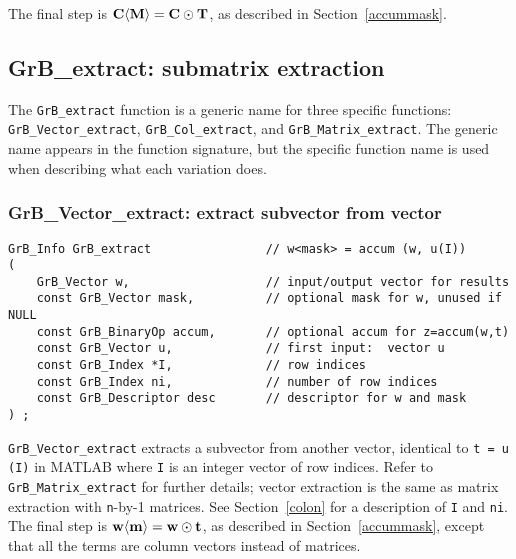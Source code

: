 \documentclass[12pt]{article}
\begin{document}
The final step is ${\bf C \langle M \rangle  = C \odot T}$, as described in
Section~\ref{accummask}.

\newpage
\subsection{{\sf GrB\_extract:} submatrix extraction } %
\label{extract}

The \verb'GrB_extract' function is a generic name for three specific functions:
\verb'GrB_Vector_extract', \verb'GrB_Col_extract', and
\verb'GrB_Matrix_extract'.  The generic name appears in the function signature,
but the specific function name is used when describing what each variation
does.

\subsubsection{{\sf GrB\_Vector\_extract:} extract subvector from vector}
\label{extract_vector}

\begin{mdframed}[userdefinedwidth=6in]
{\footnotesize
\begin{verbatim}
GrB_Info GrB_extract                // w<mask> = accum (w, u(I))
(
    GrB_Vector w,                   // input/output vector for results
    const GrB_Vector mask,          // optional mask for w, unused if NULL
    const GrB_BinaryOp accum,       // optional accum for z=accum(w,t)
    const GrB_Vector u,             // first input:  vector u
    const GrB_Index *I,             // row indices
    const GrB_Index ni,             // number of row indices
    const GrB_Descriptor desc       // descriptor for w and mask
) ;
\end{verbatim} } \end{mdframed}

\verb'GrB_Vector_extract' extracts a subvector from another vector, identical
to \verb't = u (I)' in MATLAB where \verb'I' is an integer vector of row
indices.  Refer to \verb'GrB_Matrix_extract' for further details; vector
extraction is the same as matrix extraction with \verb'n'-by-1 matrices.
See Section~\ref{colon} for a description of \verb'I' and \verb'ni'.
The final step is ${\bf w \langle m \rangle  = w \odot
t}$, as described in Section~\ref{accummask}, except that all the terms are
column vectors instead of matrices.
\end{document}
